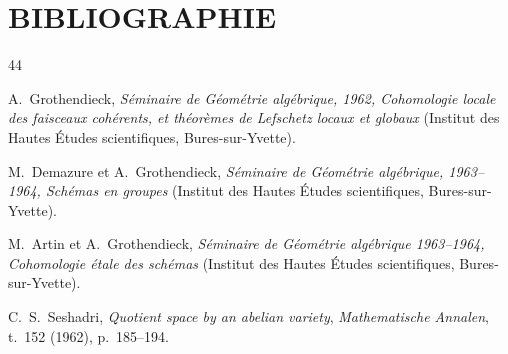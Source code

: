 \clearpage
{}
{}
\section*{BIBLIOGRAPHIE}

\begin{thebibliography}{44}

A.~Grothendieck, \emph{Séminaire de Géométrie algébrique, 1962,
Cohomologie locale des faisceaux cohérents, et théorèmes de Lefschetz locaux
et globaux} (Institut des Hautes Études scientifiques, Bures-sur-Yvette).

M.~Demazure et A.~Grothendieck, \emph{Séminaire de Géométrie algébrique,
1963--1964, Schémas en groupes} (Institut des Hautes Études scientifiques,
Bures-sur-Yvette).

M.~Artin et A.~Grothendieck, \emph{Séminaire de Géométrie algébrique
1963--1964, Cohomologie étale des schémas} (Institut des Hautes Études
scientifiques, Bures-sur-Yvette).

C.~S.~Seshadri, \emph{Quotient space by an abelian variety},
\emph{Mathematische Annalen}, t.~152 (1962), p.~185--194.

\end{thebibliography}
